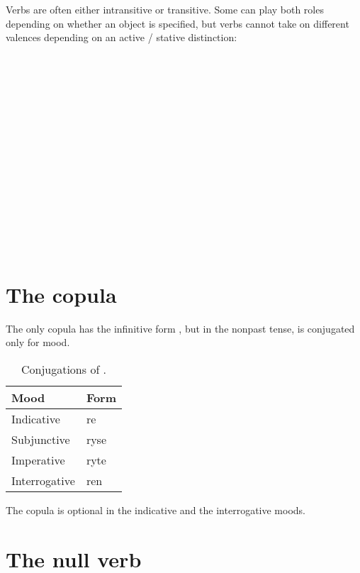 \documentclass{book}
\begin{document}
Verbs are often either intransitive or transitive. Some can play both roles depending on whether an object is specified, but verbs cannot take on different valences depending on an active / stative distinction: \\
~\\
 \\
 \\
 \\
~\\
  \\
  \\
  \\
~\\
  \\
  \\
  \\
~\\
   \\
   \\
  

\section{The copula}

The only copula has the infinitive form , but in the nonpast tense, is conjugated only for mood.

\begin{table}[H]
  \caption{Conjugations of .}
  \centering
	\begin{tabular}{|l|l|}
		\hline
		Mood & Form \\ \hline
		Indicative & re \\
		Subjunctive & ryse \\
		Imperative & ryte \\
		Interrogative & ren \\ \hline
	\end{tabular}
\end{table}

The copula is optional in the indicative and the interrogative moods.

\section{The null verb}
\end{document}
